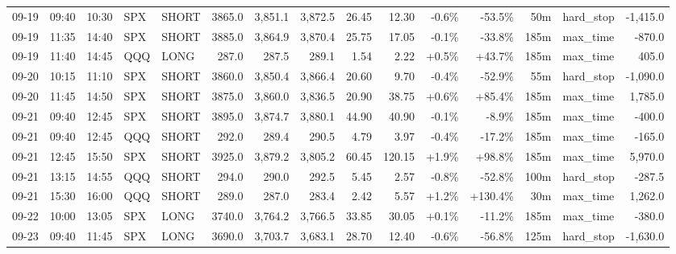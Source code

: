 \documentclass[11pt,a4paper,twoside]{article}
\begin{document}
\begin{landscape}
\begin{center}
\begin{longtable}{>{\color{txtmain}}l l l l l r r r r r r r r >{\color{txtmain}}l r}
09-19 & 09:40 & 10:30 & SPX & SHORT & 3865.0 & 3,851.1 & 3,872.5 & 26.45 & 12.30 & \textcolor{lossred}{-0.6\%} & \textcolor{lossred}{-53.5\%} & 50m & hard\_stop & \textcolor{lossred}{-1,415.0} \\
09-19 & 11:35 & 14:40 & SPX & SHORT & 3885.0 & 3,864.9 & 3,870.4 & 25.75 & 17.05 & \textcolor{lossred}{-0.1\%} & \textcolor{lossred}{-33.8\%} & 185m & max\_time & \textcolor{lossred}{-870.0} \\
09-19 & 11:40 & 14:45 & QQQ & LONG & 287.0 & 287.5 & 289.1 & 1.54 & 2.22 & \textcolor{wingreen}{+0.5\%} & \textcolor{wingreen}{+43.7\%} & 185m & max\_time & \textcolor{wingreen}{405.0} \\
09-20 & 10:15 & 11:10 & SPX & SHORT & 3860.0 & 3,850.4 & 3,866.4 & 20.60 & 9.70 & \textcolor{lossred}{-0.4\%} & \textcolor{lossred}{-52.9\%} & 55m & hard\_stop & \textcolor{lossred}{-1,090.0} \\
09-20 & 11:45 & 14:50 & SPX & SHORT & 3875.0 & 3,860.0 & 3,836.5 & 20.90 & 38.75 & \textcolor{wingreen}{+0.6\%} & \textcolor{wingreen}{+85.4\%} & 185m & max\_time & \textcolor{wingreen}{1,785.0} \\
09-21 & 09:40 & 12:45 & SPX & SHORT & 3895.0 & 3,874.7 & 3,880.1 & 44.90 & 40.90 & \textcolor{lossred}{-0.1\%} & \textcolor{lossred}{-8.9\%} & 185m & max\_time & \textcolor{lossred}{-400.0} \\
09-21 & 09:40 & 12:45 & QQQ & SHORT & 292.0 & 289.4 & 290.5 & 4.79 & 3.97 & \textcolor{lossred}{-0.4\%} & \textcolor{lossred}{-17.2\%} & 185m & max\_time & \textcolor{lossred}{-165.0} \\
09-21 & 12:45 & 15:50 & SPX & SHORT & 3925.0 & 3,879.2 & 3,805.2 & 60.45 & 120.15 & \textcolor{wingreen}{+1.9\%} & \textcolor{wingreen}{+98.8\%} & 185m & max\_time & \textcolor{wingreen}{5,970.0} \\
09-21 & 13:15 & 14:55 & QQQ & SHORT & 294.0 & 290.0 & 292.5 & 5.45 & 2.57 & \textcolor{lossred}{-0.8\%} & \textcolor{lossred}{-52.8\%} & 100m & hard\_stop & \textcolor{lossred}{-287.5} \\
09-21 & 15:30 & 16:00 & QQQ & SHORT & 289.0 & 287.0 & 283.4 & 2.42 & 5.57 & \textcolor{wingreen}{+1.2\%} & \textcolor{wingreen}{+130.4\%} & 30m & max\_time & \textcolor{wingreen}{1,262.0} \\
09-22 & 10:00 & 13:05 & SPX & LONG & 3740.0 & 3,764.2 & 3,766.5 & 33.85 & 30.05 & \textcolor{wingreen}{+0.1\%} & \textcolor{lossred}{-11.2\%} & 185m & max\_time & \textcolor{lossred}{-380.0} \\
09-23 & 09:40 & 11:45 & SPX & LONG & 3690.0 & 3,703.7 & 3,683.1 & 28.70 & 12.40 & \textcolor{lossred}{-0.6\%} & \textcolor{lossred}{-56.8\%} & 125m & hard\_stop & \textcolor{lossred}{-1,630.0} \\

\end{longtable}
\end{center}
\end{landscape}
\end{document}
